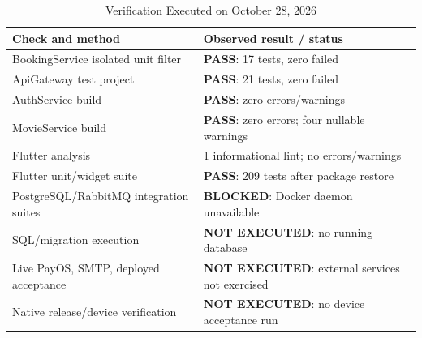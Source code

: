 \begin{table}[t]
\caption{Verification Executed on October 28, 2026}\label{tab:tests}
\centering\footnotesize
\begin{tabularx}{\columnwidth}{@{}YY@{}}\toprule
\textbf{Check and method} & \textbf{Observed result / status}\\\midrule
BookingService isolated unit filter & \textbf{PASS}: 17 tests, zero failed\\
ApiGateway test project & \textbf{PASS}: 21 tests, zero failed\\
AuthService build & \textbf{PASS}: zero errors/warnings\\
MovieService build & \textbf{PASS}: zero errors; four nullable warnings\\
Flutter analysis & 1 informational lint; no errors/warnings\\
Flutter unit/widget suite & \textbf{PASS}: 209 tests after package restore\\
PostgreSQL/RabbitMQ integration suites & \textbf{BLOCKED}: Docker daemon unavailable\\
SQL/migration execution & \textbf{NOT EXECUTED}: no running database\\
Live PayOS, SMTP, deployed acceptance & \textbf{NOT EXECUTED}: external services not exercised\\
Native release/device verification & \textbf{NOT EXECUTED}: no device acceptance run\\\bottomrule
\end{tabularx}
\end{table}
